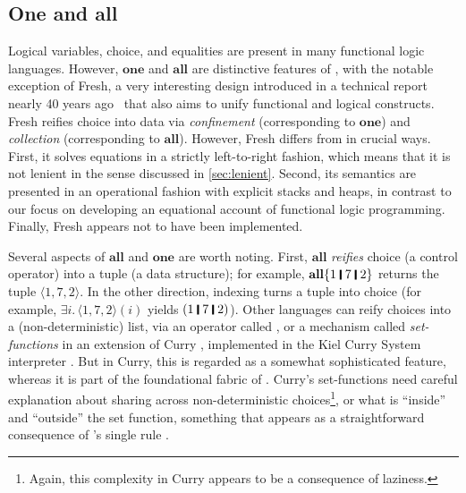 \documentclass[acmsmall]{acmart}
\newcommand{\Varid}[1]{\mathit{#1}}
\begin{document}
\subsection{One and all}

Logical variables, choice, and equalities are present in many functional logic
languages.  However, \ensuremath{\textbf{one}} and \ensuremath{\textbf{all}} are distinctive features of \versecalc{},
with the notable exception of Fresh, a very interesting design introduced in a
technical report nearly 40 years ago~\cite{smolka:fresh} that also aims
to unify functional and logical constructs.
%
Fresh reifies choice into data via \emph{confinement} (corresponding to \ensuremath{\textbf{one}})
and \emph{collection} (corresponding to \ensuremath{\textbf{all}}).
%
However, Fresh differs from \versecalc{} in crucial ways.
%
First, it solves equations in a strictly left-to-right fashion, which means that
it is not lenient in the sense discussed in \cref{sec:lenient}.
%
Second, its semantics are presented in an operational fashion with explicit stacks and heaps,
in contrast to our focus on developing an equational account of functional logic programming.
%
Finally, Fresh appears not to have been implemented.
%

Several aspects of \ensuremath{\textbf{all}} and \ensuremath{\textbf{one}} are worth noting.
First, \ensuremath{\textbf{all}} \emph{reifies} choice (a control operator) into a tuple (a data structure);
for example, \ensuremath{\textbf{all}\{\mathrm{1}\;\rule[-0.1em]{0.15em}{0.75em}\;\mathrm{7}\;\rule[-0.1em]{0.15em}{0.75em}\;\mathrm{2}\}} returns the tuple \ensuremath{\langle{}\mathrm{1},\mathrm{7},\mathrm{2}\rangle}.
In the other direction, indexing turns a tuple into choice (for example, \ensuremath{\exists\Varid{i}.\,\langle{}\mathrm{1},\mathrm{7},\mathrm{2}\rangle(\Varid{i})} yields \ensuremath{(\mathrm{1}\;\rule[-0.1em]{0.15em}{0.75em}\;\mathrm{7}\;\rule[-0.1em]{0.15em}{0.75em}\;\mathrm{2})}).
Other languages can reify choices into a (non-deterministic)
list, via an operator called , or a mechanism called
\emph{set-functions} in an extension of Curry \cite[Section 4.2.7]{curry:tutorial},
implemented in the Kiel Curry System interpreter \cite{brassel:encapsulated,kics,hanus:set-functions}.
But in Curry, this is regarded as a somewhat sophisticated feature,
whereas it is part of the foundational fabric of \versecalc{}.
Curry's set-functions need careful explanation about sharing across non-deterministic choices\footnote{
Again, this complexity in Curry
appears to be a consequence of laziness.},
or what is ``inside'' and ``outside'' the set function, something that appears as a straightforward
consequence of \versecalc{}'s single rule .
\end{document}
